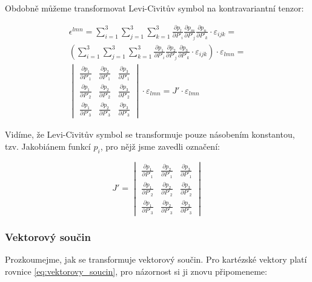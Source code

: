 Obdobně můžeme transformovat Levi-Civitův symbol na kontravariantní tenzor:

\begin{equation}
\begin{split}
\epsilon^{lmn} = \sum_{i=1}^3 \sum_{j=1}^3 \sum_{k=1}^3 \frac{\partial p_l}{\partial P'_i} \frac{\partial p_m}{\partial P'_j} \frac{\partial p_n}{\partial P'_k} \cdot \varepsilon_{ijk} = \\
\left(\sum_{i=1}^3 \sum_{j=1}^3 \sum_{k=1}^3 \frac{\partial p_1}{\partial P'_i} \frac{\partial p_2}{\partial P'_j} \frac{\partial p_3}{\partial P'_k} \cdot \varepsilon_{ijk} \right) \cdot \varepsilon_{lmn} = \\
\begin{vmatrix}
  \frac{\partial p_1}{\partial P'_1} & \frac{\partial p_2}{\partial P'_1} & \frac{\partial p_3}{\partial P'_1} \\
  \frac{\partial p_1}{\partial P'_2} & \frac{\partial p_2}{\partial P'_2} & \frac{\partial p_3}{\partial P'_2} \\
  \frac{\partial p_1}{\partial P'_3} & \frac{\partial p_2}{\partial P'_3} & \frac{\partial p_3}{\partial P'_3}
\end{vmatrix}
\cdot \varepsilon_{lmn}  = J' \cdot \varepsilon_{lmn}
\end{split}
\end{equation}

Vidíme, že Levi-Civitův symbol se transformuje pouze násobením konstantou, tzv. Jakobiánem funkcí \(p_i\), pro nějž jsme zavedli označení:

\begin{equation}
J' = \begin{vmatrix}
  \frac{\partial p_1}{\partial P'_1} & \frac{\partial p_2}{\partial P'_1} & \frac{\partial p_3}{\partial P'_1} \\
  \frac{\partial p_1}{\partial P'_2} & \frac{\partial p_2}{\partial P'_2} & \frac{\partial p_3}{\partial P'_2} \\
  \frac{\partial p_1}{\partial P'_3} & \frac{\partial p_2}{\partial P'_3} & \frac{\partial p_3}{\partial P'_3}
\end{vmatrix}
\end{equation}

\subsubsection{Vektorový součin}

Prozkoumejme, jak se transformuje vektorový součin. Pro kartézské vektory platí rovnice \eqref{eq:vektorovy_soucin}, pro názornost si ji znovu připomeneme:

